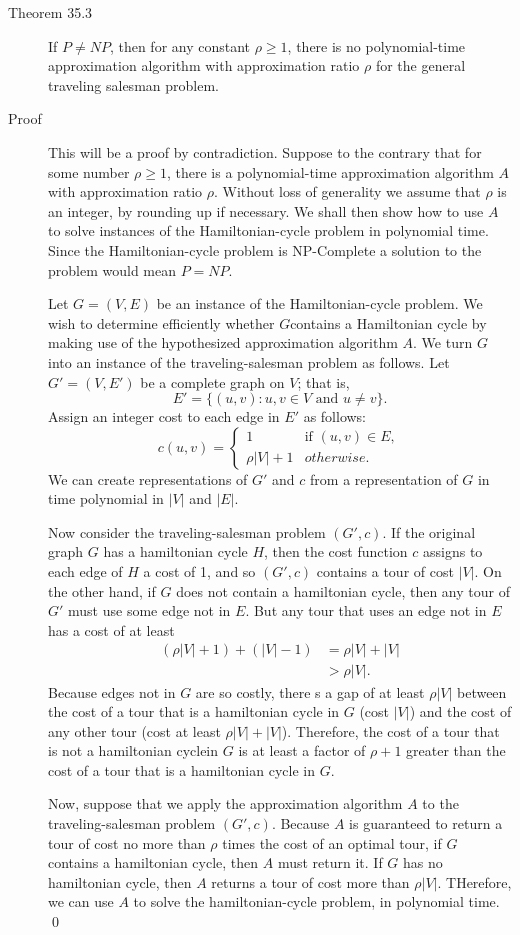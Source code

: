 \begin{description}
\item[Theorem 35.3] If $P\neq NP$, then for any constant $\rho \geq 1$, there is no polynomial-time
  approximation algorithm with approximation ratio $\rho$ for the general traveling salesman problem.

\item[Proof] This will be a proof by contradiction. Suppose to the contrary that for some number $\rho
  \geq 1$, there is a polynomial-time approximation algorithm $A$ with approximation ratio $\rho$. Without loss of generality we assume that $\rho$ is an integer, by rounding up if necessary.
  We shall then show how to use $A$ to solve instances of the Hamiltonian-cycle problem in polynomial time. Since the Hamiltonian-cycle problem is NP-Complete a solution to the problem would mean $P=NP$.
  
  Let $G = (V,E)$ be an instance of the Hamiltonian-cycle problem. We wish to determine efficiently whether $G$contains a Hamiltonian cycle by making use of the hypothesized approximation algorithm $A$.
  We turn $G$ into an instance of the traveling-salesman problem as follows. Let $G' = (V,E')$ be a complete graph on $V$; that is,
  \[
    E' = \{(u,v) : u,v \in V \text{ and } u\neq v\}.
  \]
  Assign an integer cost to each edge in $E'$ as follows:
  \[
    c(u,v) = \begin{cases}
      1         & \text{if } (u,v) \in E,\\
      \rho|V|+1 & otherwise.
    \end{cases}
  \]
  We can create representations of $G'$ and $c$ from a representation of $G$ in time polynomial in $|V|$ and $|E|$.
  
  Now consider the traveling-salesman problem $(G',c)$. If the original graph $G$ has a hamiltonian cycle $H$, then the cost function $c$ assigns to each edge of $H$ a cost of 1, and so
  $(G',c)$ contains a tour of cost $|V|$. On the other hand, if $G$ does not contain a hamiltonian cycle, then any tour of $G'$ must use some edge not in $E$.
  But any tour that uses an edge not in $E$ has a cost of at least
  \begin{align*}
    (\rho|V|+1)+(|V|-1) &= \rho|V|+|V| \\
                        &> \rho|V|.
  \end{align*}
  Because edges not in $G$ are so costly, there s a gap of at least $\rho|V|$ between the cost of a tour that is a hamiltonian cycle in $G$ (cost $|V|$) and the cost of any other tour
  (cost at least $\rho|V|+|V|$). Therefore, the cost of a tour that is not a hamiltonian cyclein $G$ is at least a factor of $\rho+1$ greater than the cost of a tour that is a hamiltonian cycle in $G$.
  
  Now, suppose that we apply the approximation algorithm $A$ to the traveling-salesman problem $(G',c)$. Because $A$ is guaranteed to return a tour of cost no more than $\rho$ times the cost of an
  optimal tour, if $G$ contains a hamiltonian cycle, then $A$ must return it. If $G$ has no hamiltonian cycle, then $A$ returns a tour of cost more than $\rho|V|$. THerefore, we can use $A$ to solve the hamiltonian-cycle problem, in polynomial time. \qed  
\end{description}
